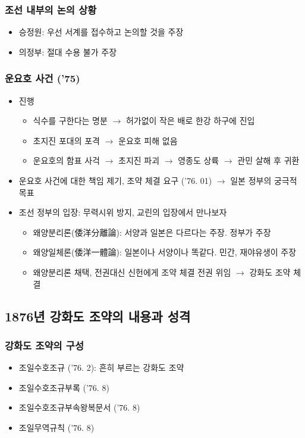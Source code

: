 \subsubsection*{조선 내부의 논의 상황}
\begin{itemize}
    \item 승정원: 우선 서계를 접수하고 논의할 것을 주장
    \item 의정부: 절대 수용 불가 주장
\end{itemize}

\subsubsection*{운요호 사건 ('75)}
\begin{itemize}
    \item 진행
    \begin{itemize}
        \item 식수를 구한다는 명분 $\rightarrow$ 허가없이 작은 배로 한강 하구에 진입
        \item 초지진 포대의 포격 $\rightarrow$ 운요호 피해 없음
        \item 운요호의 함표 사걱 $\rightarrow$ 초지진 파괴 $\rightarrow$ 영종도 상륙 $\rightarrow$ 관민 살해 후 귀환
    \end{itemize}
    \item 운요호 사건에 대한 책임 제기, 조약 체결 요구 ('76. 01) $\rightarrow$ 일본 정부의 궁극적 목표
    \item 조선 정부의 입장: 무력시위 방지, 교린의 입장에서 만나보자
    \begin{itemize}
        \item 왜양분리론(倭洋分離論): 서양과 일본은 다르다는 주장. 정부가 주장
        \item 왜양일체론(倭洋一體論): 일본이나 서양이나 똑같다. 민간, 재야유생이 주장
        \item 왜양분리론 채택, 전권대신 신헌에게 조약 체결 전권 위임 $\rightarrow$ 강화도 조약 체결
    \end{itemize}
\end{itemize}

\subsection{1876년 강화도 조약의 내용과 성격}

\subsubsection*{강화도 조약의 구성}
\begin{itemize}
    \item 조일수호조규 ('76. 2): 흔히 부르는 강화도 조약
    \item 조일수호조규부록 ('76. 8)
    \item 조일수호조규부속왕복문서 ('76. 8)
    \item 조일무역규칙 ('76. 8)
\end{itemize}

